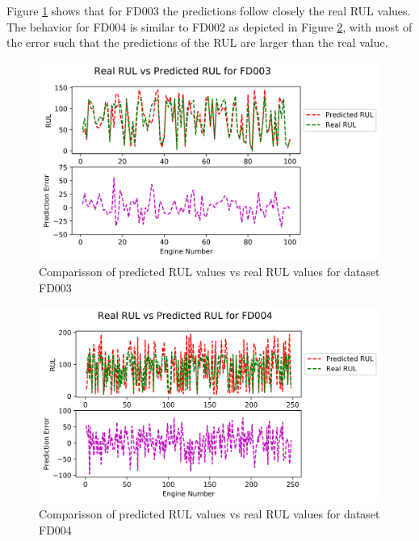 \documentclass[preprint,12pt]{elsarticle}%
\begin{document}
\pagebreak

Figure \ref{Fig:rul_plots_dataset_3} shows that for FD003 the predictions follow closely the real RUL values. The behavior for FD004 is similar to FD002 as depicted in Figure \ref{Fig:rul_plots_dataset_4}, with most of the error such that the predictions of the RUL are larger than the real value.

\begin{figure}[!h]
\begin{center}
\includegraphics[scale=0.70]{Figures/rul_plots_dataset_3.png}
\caption{Comparisson of predicted RUL values vs real RUL values for dataset FD003}
\label{Fig:rul_plots_dataset_3}
\end{center}
\end{figure}

\begin{figure}[!h]
\begin{center}
\includegraphics[scale=0.70]{Figures/rul_plots_dataset_4.png}
\caption{Comparisson of predicted RUL values vs real RUL values for dataset FD004}
\label{Fig:rul_plots_dataset_4}
\end{center}
\end{figure}
\end{document}

